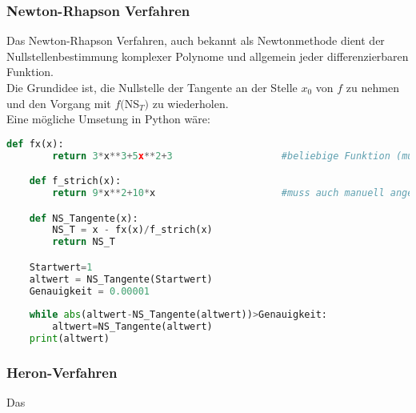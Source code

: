 \subsubsection{Newton-Rhapson Verfahren}
Das Newton-Rhapson Verfahren, auch bekannt als Newtonmethode dient der Nullstellenbestimmung komplexer Polynome und allgemein jeder differenzierbaren Funktion.\\
Die Grundidee ist, die Nullstelle der Tangente an der Stelle $x_0$ von $f$ zu nehmen und den Vorgang mit $f($NS$_T)$ zu wiederholen.\\
Eine mögliche Umsetung in Python wäre:\\
\begin{lstlisting}[language=Python]
	def fx(x):
		return 3*x**3+5x**2+3					#beliebige Funktion (muss angegeben werden)

	def f_strich(x):
		return 9*x**2+10*x						#muss auch manuell angegeben werden

	def NS_Tangente(x):
		NS_T = x - fx(x)/f_strich(x)
		return NS_T

	Startwert=1
	altwert = NS_Tangente(Startwert)
	Genauigkeit = 0.00001
	
	while abs(altwert-NS_Tangente(altwert))>Genauigkeit:
		altwert=NS_Tangente(altwert)
	print(altwert)

\end{lstlisting}
\subsubsection{Heron-Verfahren}
Das
